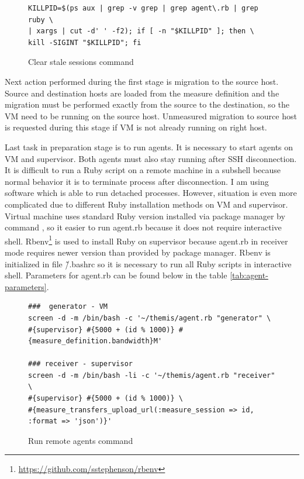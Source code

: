 \begin{figure}[htb]
\begin{verbatim}
KILLPID=$(ps aux | grep -v grep | grep agent\.rb | grep ruby \
| xargs | cut -d' ' -f2); if [ -n "$KILLPID" ]; then \
kill -SIGINT "$KILLPID"; fi 
\end{verbatim}
\caption{Clear stale sessions command}
\label{cmd:killcmd}
\end{figure}

Next action performed during the first stage is migration to the source host. Source and destination hosts are loaded from the measure definition and the migration must be performed exactly from the source to the destination, so the \Ac{VM} need to be running on the source host. Unmeasured migration to source host is requested during this stage if \Ac{VM} is not already running on right host.

Last task in preparation stage is to run agents. It is necessary to start agents on \Ac{VM} and supervisor. Both agents must also stay running after \Ac{SSH} disconnection. It is difficult to run a Ruby script on a remote machine in a subshell because normal behavior it is to terminate process after disconnection. I am using \Cmd{screen} software which is able to run detached processes. However, situation is even more complicated due to different Ruby installation methods on \Ac{VM} and supervisor. Virtual machine uses standard Ruby version installed via package manager by command , so it easier to run agent.rb because it does not require interactive shell. Rbenv\footnote{\url{https://github.com/sstephenson/rbenv}} is used to install Ruby on supervisor because agent.rb in receiver mode requires newer version than provided by package manager. Rbenv is initialized in file \~/.bashrc so it is necessary to run all Ruby scripts in interactive shell. Parameters for agent.rb can be found below in the table \ref{tab:agent-parameters}.

\begin{figure}[htb]
\caption{Run remote agents command}
\label{cmd:remote agents}
\begin{verbatim}
###  generator - VM
screen -d -m /bin/bash -c '~/themis/agent.rb "generator" \
#{supervisor} #{5000 + (id % 1000)} #{measure_definition.bandwidth}M'

### receiver - supervisor
screen -d -m /bin/bash -li -c '~/themis/agent.rb "receiver" \
#{supervisor} #{5000 + (id % 1000)} \
#{measure_transfers_upload_url(:measure_session => id, :format => 'json')}'
\end{verbatim}
\end{figure}

